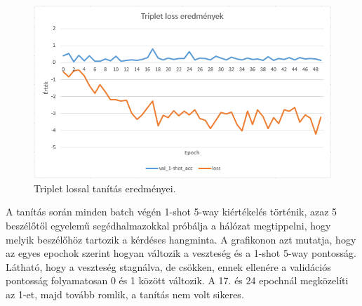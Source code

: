 \begin{figure}[!ht]
	\centering
	\includegraphics[width=150mm, keepaspectratio]{figures/triplet-loss-chart.png}
	\caption{Triplet lossal tanítás eredményei.}
	\label{fig:triplet-loss-chart}
\end{figure}

A tanítás során minden batch végén 1-shot 5-way kiértékelés történik, azaz 5 beszélőtől egyelemű segédhalmazokkal próbálja a hálózat megtippelni, hogy melyik beszélőhöz tartozik a kérdéses hangminta.
\newline
\newline
A grafikonon azt mutatja, hogy az egyes epochok szerint hogyan változik a veszteség és a 1-shot 5-way pontosság. Látható, hogy a veszteség stagnálva, de csökken, ennek ellenére a validációs pontosság folyamatosan 0 és 1 között változik. A 17. és 24 epochnál megközelíti az 1-et, majd tovább romlik, a tanítás nem volt sikeres.